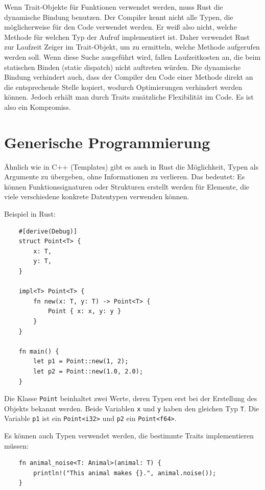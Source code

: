 Wenn Trait-Objekte für Funktionen verwendet werden, muss Rust die dynamische Bindung benutzen. Der Compiler kennt nicht alle Typen, die möglicherweise für den Code verwendet werden. Er weiß also nicht, welche Methode für welchen Typ der Aufruf implementiert ist. Daher verwendet Rust zur Laufzeit Zeiger im Trait-Objekt, um zu ermitteln, welche Methode aufgerufen werden soll. Wenn diese Suche ausgeführt wird, fallen Laufzeitkosten an, die beim statischen Binden (sta\-tic dispatch) nicht auftreten würden. Die dynamische Bindung verhindert auch, dass der Compiler den Code einer Methode direkt an die entsprechende Stelle kopiert, wodurch Optimierungen verhindert werden können. Jedoch erhält man durch Traits zusätzliche Flexibilität im Code. Es ist also ein Kompromiss.

\section{Generische Programmierung}

Ähnlich wie in C++ (Templates) gibt es auch in Rust die Möglichkeit, Typen als Argumente zu übergeben, ohne Informationen zu verlieren. Das bedeutet: Es können Funktionssignaturen oder Strukturen erstellt werden für Elemente, die viele verschiedene konkrete Datentypen verwenden können.

Beispiel in Rust:

\begin{lstlisting}
    #[derive(Debug)]
    struct Point<T> {
        x: T,
        y: T,
    }
    
    impl<T> Point<T> {
        fn new(x: T, y: T) -> Point<T> {
            Point { x: x, y: y }
        }
    }
    
    fn main() {
        let p1 = Point::new(1, 2);
        let p2 = Point::new(1.0, 2.0);
    }
\end{lstlisting}

Die Klasse \verb"Point" beinhaltet zwei Werte, deren Typen erst bei der Erstellung des Objekts bekannt werden. Beide Variablen \verb"x" und \verb"y" haben den gleichen Typ \verb"T". Die Variable \verb"p1" ist ein \verb"Point<i32>" und \verb"p2" ein \verb"Point<f64>".

Es können auch Typen verwendet werden, die bestimmte Traits implementieren müssen:

\begin{lstlisting}
    fn animal_noise<T: Animal>(animal: T) {
        println!("This animal makes {}.", animal.noise());
    }
\end{lstlisting}

